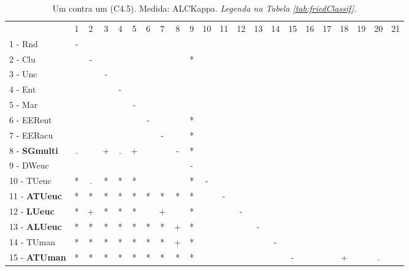 \begin{table}[h]
\caption{Um contra um (C4.5). Medida: ALCKappa. \textit{Legenda na Tabela \ref{tab:friedClassif}.}}
\begin{center}\begin{tabular}{lcc|cc|cc|cc|cc|cc|cc|cc|cc|cc|c}
 			& 1 & 2 & 3 & 4 & 5 & 6 & 7 & 8 & 9 & 10 & 11 & 12 & 13 & 14 & 15 & 16 & 17 & 18 & 19 & 20 & 21\\
1 - Rnd  	& - &   &   &   &   &   &   &   &   &   &   &   &   &   &   &   &   &   &   &   &   \\
2 - Clu  	&   & - &   &   &   &   &   &   & * &   &   &   &   &   &   &   &   &   &   &   &   \\ \hline
3 - Unc  	&   &   & - &   &   &   &   &   &   &   &   &   &   &   &   &   &   &   &   &   &   \\
4 - Ent  	&   &   &   & - &   &   &   &   &   &   &   &   &   &   &   &   &   &   &   &   &   \\ \hline
5 - Mar  	&   &   &   &   & - &   &   &   &   &   &   &   &   &   &   &   &   &   &   &   &   \\
6 - EERent	&   &   &   &   &   & - &   &   & * &   &   &   &   &   &   &   &   &   &   &   &   \\ \hline
7 - EERacu	&   &   &   &   &   &   & - &   & * &   &   &   &   &   &   &   &   &   &   &   &   \\
8 - \textbf{SGmulti}	& . &   & + & . & + &   &   & - & * &   &   &   &   &   &   &   &   &   &   &   &   \\ \hline
9 - DWeuc	&   &   &   &   &   &   &   &   & - &   &   &   &   &   &   &   &   &   &   &   &   \\
10 - TUeuc	& * & . & * & * & * &   &   &   & * & - &   &   &   &   &   &   &   &   &   &   &   \\ \hline
11 - \textbf{ATUeuc}	& * & * & * & * & * & * & * & * & * &   & - &   &   &   &   &   &   &   &   &   &   \\
12 - \textbf{LUeuc}	& * & + & * & * & * &   & + &   & * &   &   & - &   &   &   &   &   &   &   &   &   \\ \hline
13 - \textbf{ALUeuc}	& * & * & * & * & * & * & * & + & * &   &   &   & - &   &   &   &   &   &   &   &   \\
14 - TUman	& * & * & * & * & * & * & * & + & * &   &   &   &   & - &   &   &   &   &   &   &   \\ \hline
15 - \textbf{ATUman}	& * & * & * & * & * & * & * & * & * &   &   &   &   &   & - &   &   & + &   & . &   \\

\end{tabular}
\end{center}
\end{table}
